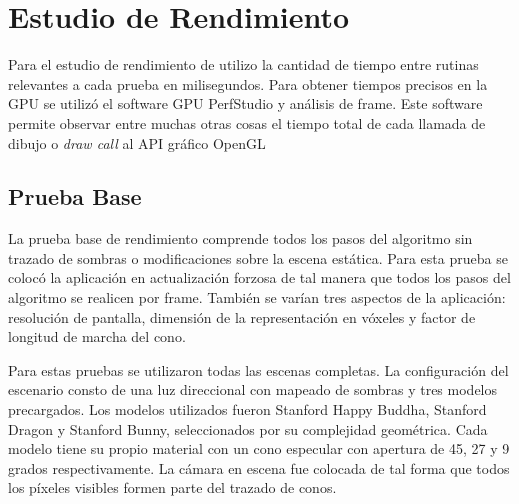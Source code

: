 \section{Estudio de Rendimiento}

Para el estudio de rendimiento de utilizo la cantidad de tiempo entre rutinas relevantes a cada prueba en milisegundos. Para obtener tiempos precisos en la \ac{GPU} se utilizó el software GPU PerfStudio y análisis de frame. Este software permite observar entre muchas otras cosas el tiempo total de cada llamada de dibujo o \emph{draw call} al API gráfico OpenGL

\subsection{Prueba Base}
La prueba base de rendimiento comprende todos los pasos del algoritmo sin trazado de sombras o modificaciones sobre la escena estática. Para esta prueba se colocó la aplicación en actualización forzosa de tal manera que todos los pasos del algoritmo se realicen por frame. También se varían tres aspectos de la aplicación: resolución de pantalla, dimensión de la representación en vóxeles y factor de longitud de marcha del cono.

Para estas pruebas se utilizaron todas las escenas completas. La configuración del escenario consto de una luz direccional con mapeado de sombras y tres modelos precargados. Los modelos utilizados fueron Stanford Happy Buddha, Stanford Dragon y Stanford Bunny, seleccionados por su complejidad geométrica. Cada modelo tiene su propio material con un cono especular con apertura de 45, 27 y 9 grados respectivamente. La cámara en escena fue colocada de tal forma que todos los píxeles  visibles formen parte del trazado de conos. 

